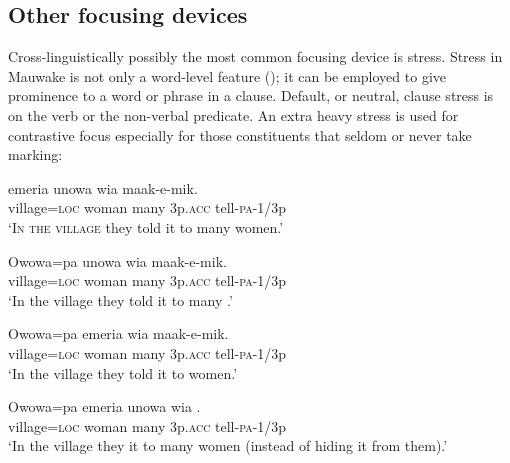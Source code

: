\subsection{Other focusing devices}

Cross-linguistically possibly the most common focusing device is stress. Stress in Mauwake is not only a word-level feature (); it can be employed to give prominence to a word or phrase in a clause. Default, or neutral, clause stress is on the verb or the non-verbal predicate. An extra heavy stress is used for contrastive focus especially for those constituents that seldom or never take  marking:  

\ea%
\label{ex:x1739}
\gll {}\textstyleEmphasizedVernacularWords{{{\textprimstress}}}  emeria  unowa  wia  maak-e-mik. \\
village=\textsc{loc}  woman  many  3p.\textsc{acc}  tell-\textsc{pa}-1/3p      \\
\glt`\textsc{In the village} they told it to many women.'
\z


\ea%
\label{ex:x1740}
\gll Owowa=pa  \textstyleEmphasizedVernacularWords{{{\textprimstress}}}  unowa  wia  maak-e-mik. \\
village=\textsc{loc}  woman  many  3p.\textsc{acc}  tell-\textsc{pa}-1/3p      \\
\glt`In the village they told it to many .'
\z


\ea%
\label{ex:x1741}
\gll Owowa=pa  emeria  \textstyleEmphasizedVernacularWords{{{\textprimstress}}}  wia  maak-e-mik. \\
village=\textsc{loc}  woman  many  3p.\textsc{acc}  tell-\textsc{pa}-1/3p      \\
\glt`In the village they told it to  women.'
\z


\ea%
\label{ex:x1742}
\gll Owowa=pa  emeria  unowa  wia  \textstyleEmphasizedVernacularWords{{{\textprimstress}}}. \\
village=\textsc{loc}  woman  many  3p.\textsc{acc}  tell-\textsc{pa}-1/3p      \\
\glt`In the village they  it to many women (instead of hiding it from them).'
\z


